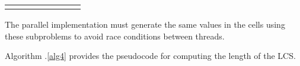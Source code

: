 \documentclass[usletter, 11pt]{extarticle}
\begin{document}
\begin{table}[h]
\begin{tabular}{|@{\rule[-0.5cm]{0pt}{1cm}}*{8}{M{1cm} |}}
        \hline

         &  &
         &
         &
         &
         &
         &
         \\

        \hline

         &  &
         &
         &
         &
         &
         &
         \\

        \hline

    \end{tabular}






\end{table}

    The parallel implementation must generate the same values in the cells
    using these subproblems to avoid race conditions between threads.

    Algorithm \thesection .\ref{alg4} provides the pseudocode for computing the
    length of the LCS.
\end{document}
